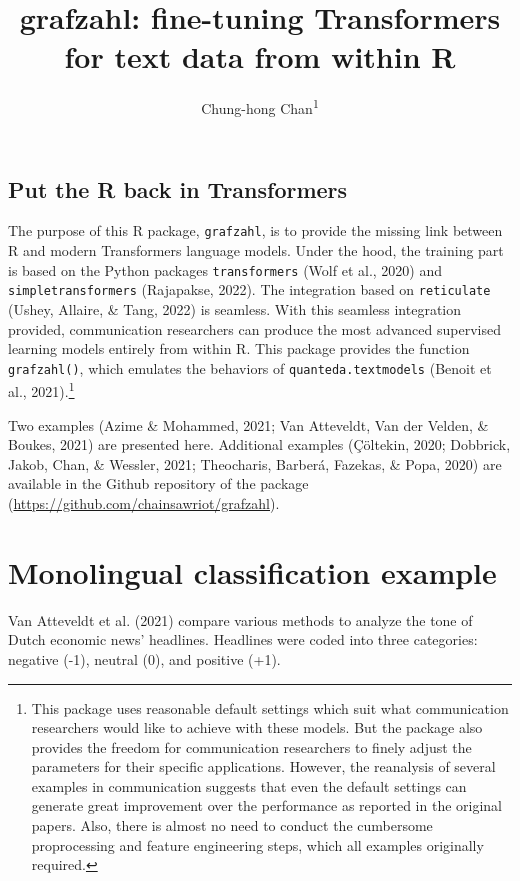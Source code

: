 \documentclass[
  english,
  man,floatsintext]{apa6}
\title{grafzahl: fine-tuning Transformers for text data from within R}
\author{Chung-hong Chan\textsuperscript{1}}
\date{}
\affiliation{\vspace{0.5cm}\textsuperscript{1} GESIS - Leibniz-Institut für Sozialwissenschaften, Germany}
\begin{document}
\maketitle

\hypertarget{put-the-r-back-in-transformers}{%
\subsection{Put the R back in Transformers}\label{put-the-r-back-in-transformers}}

The purpose of this R package, \texttt{grafzahl}, is to provide the missing link between R and modern Transformers language models. Under the hood, the training part is based on the Python packages \texttt{transformers} (Wolf et al., 2020) and \texttt{simpletransformers} (Rajapakse, 2022). The integration based on \texttt{reticulate} (Ushey, Allaire, \& Tang, 2022) is seamless. With this seamless integration provided, communication researchers can produce the most advanced supervised learning models entirely from within R. This package provides the function \texttt{grafzahl()}, which emulates the behaviors of \texttt{quanteda.textmodels} (Benoit et al., 2021).\footnote{This package uses reasonable default settings which suit what communication researchers would like to achieve with these models. But the package also provides the freedom for communication researchers to finely adjust the parameters for their specific applications. However, the reanalysis of several examples in communication suggests that even the default settings can generate great improvement over the performance as reported in the original papers. Also, there is almost no need to conduct the cumbersome proprocessing and feature engineering steps, which all examples originally required.}

Two examples (Azime \& Mohammed, 2021; Van Atteveldt, Van der Velden, \& Boukes, 2021) are presented here. Additional examples (Çöltekin, 2020; Dobbrick, Jakob, Chan, \& Wessler, 2021; Theocharis, Barberá, Fazekas, \& Popa, 2020) are available in the Github repository of the package (\url{https://github.com/chainsawriot/grafzahl}).

\hypertarget{monolingual-classification-example}{%
\section{Monolingual classification example}\label{monolingual-classification-example}}

Van Atteveldt et al. (2021) compare various methods to analyze the tone of Dutch economic news' headlines. Headlines were coded into three categories: negative (-1), neutral (0), and positive (+1).
\end{document}
